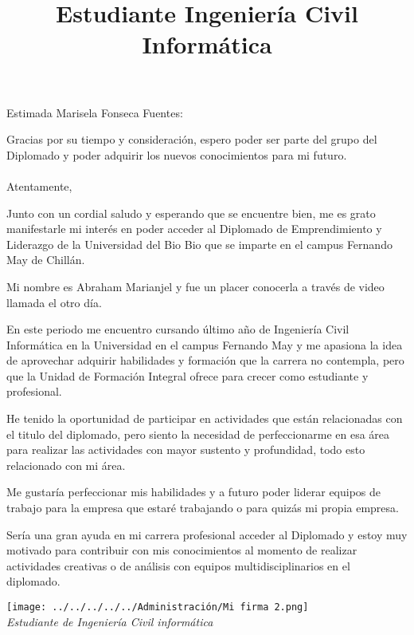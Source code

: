 \documentclass[12pt,a4paper,sans]{moderncv}        %
\title{Estudiante Ingeniería Civil Informática}   %
\begin{document}
\opening{Estimada Marisela Fonseca Fuentes:}
\closing{\hspace{1em} Gracias por su tiempo y consideración, espero poder ser parte del grupo del Diplomado y poder adquirir los nuevos conocimientos para mi futuro.\\
\\Atentamente,}
\makelettertitle

\justify
\hspace{1em} Junto con un cordial saludo y esperando que se encuentre bien, me es grato manifestarle mi interés en poder acceder al Diplomado de Emprendimiento y Liderazgo de la Universidad del Bio Bio que se imparte en el campus Fernando May de Chillán.\par

\hspace{1em}Mi nombre es Abraham Marianjel y fue un placer conocerla a través de video llamada el otro día. \par

\hspace{1em}En este periodo me encuentro cursando último año de Ingeniería Civil Informática en la Universidad en el campus Fernando May y me apasiona la idea de aprovechar adquirir habilidades y formación que la carrera no contempla, pero que la Unidad de Formación Integral ofrece para crecer como estudiante y profesional. \par

\hspace{1em}He tenido la oportunidad de participar en actividades que están relacionadas con el titulo del diplomado, pero siento la necesidad de perfeccionarme en esa área para realizar las actividades con mayor sustento y profundidad, todo esto relacionado con mi área. \par

\hspace{1em}Me gustaría perfeccionar mis habilidades y a futuro poder liderar equipos de trabajo para la empresa que estaré trabajando o para quizás mi propia empresa. \par

\hspace{1em}Sería una gran ayuda en mi carrera profesional acceder al Diplomado y estoy muy motivado para contribuir con mis conocimientos al momento de realizar actividades creativas o de análisis con equipos multidisciplinarios en el diplomado. \par

\makeletterclosing
\begin{center}
	\texttt{[image: ../../../../../Administración/Mi firma 2.png]}  \\
	\emph{Estudiante de Ingeniería Civil informática }
\end{center}
\end{document}
